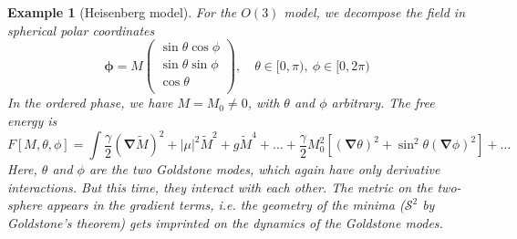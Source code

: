 \documentclass[a4paper]{article}
\newtheorem{eg}{Example}[section]
\theoremstyle{new}
\begin{document}
\begin{eg}[Heisenberg model]
For the $O(3)$ model, we decompose the field in spherical polar coordinates
$$\boldsymbol{\phi}=M\begin{pmatrix}\sin\theta\cos\phi\\\sin\theta\sin\phi\\\cos\theta\\\end{pmatrix},\quad\theta\in[0,\pi),~\phi\in[0,2\pi)$$
In the ordered phase, we have $M=M_0\neq 0$, with $\theta$ and $\phi$ arbitrary. The free energy is
$$F[M,\theta,\phi]=\int\frac{\gamma}{2}(\boldsymbol{\nabla}\tilde{M})^2+|\mu|^2\tilde{M}^2+g\tilde{M}^4+\dots+\frac{\gamma}{2}M_0^2[(\boldsymbol{\nabla}\theta)^2+\sin^2\theta(\boldsymbol{\nabla}\phi)^2]+\dots$$
Here, $\theta$ and $\phi$ are the two Goldstone modes, which again have only derivative interactions. But this time, they interact with each other. The metric on the two-sphere appears in the gradient terms, i.e. the geometry of the minima ($\mathcal{S}^2$ by Goldstone's theorem) gets imprinted on the dynamics of the Goldstone modes.
\end{eg}
\newpage
\end{document}
